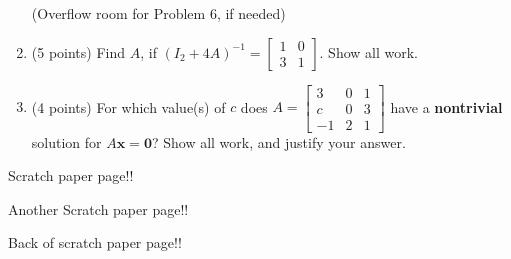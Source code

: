 \documentclass[12pt]{extarticle}
\begin{document}
\begin{enumerate}
\begin{itemize}
     \vspace{3in}

\end{itemize}


\newpage

(Overflow room for Problem 6, if needed)

\newpage


\item (5 points) Find $A$, if $(I_2+4A)^{-1}=\begin{bmatrix} 1 & 0 \\ 3 & 1\end{bmatrix}$. Show all work.    
    

    
    
    
        \newpage
    \item (4 points)  For which value(s) of $c$ does $A=\left[\begin{array}{ccc}
3 & 0 & 1 
\\
 c  & 0 & 3 
\\
 -1 & 2 & 1 
\end{array}\right]
$ have a \textbf{nontrivial} solution for $A\mathbf{x}=\mathbf{0}$? Show all work, and justify your answer.

\end{enumerate}

\newpage
Scratch paper page!!


\newpage


Another Scratch paper page!!

\newpage

Back of scratch paper page!!
\end{document}
